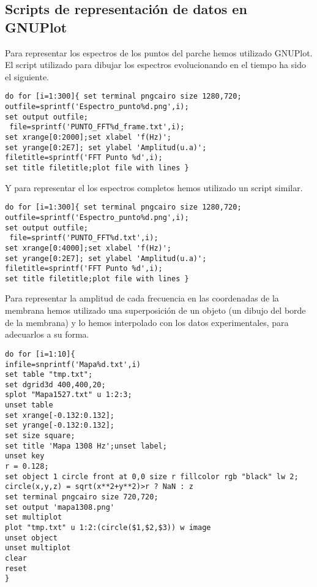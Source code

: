 \documentclass[journal, a4paper,onecolumn]{IEEEtran}
\begin{document}
\subsection{Scripts de representación de datos en GNUPlot}


Para representar los espectros de los puntos del parche hemos utilizado GNUPlot. El script utilizado para dibujar los espectros evolucionando en el tiempo ha sido el siguiente.

\begin{lstlisting}
do for [i=1:300]{ set terminal pngcairo size 1280,720;
outfile=sprintf('Espectro_punto%d.png',i); 
set output outfile;
 file=sprintf('PUNTO_FFT%d_frame.txt',i);
set xrange[0:2000];set xlabel 'f(Hz)'; 
set yrange[0:2E7]; set ylabel 'Amplitud(u.a)';
filetitle=sprintf('FFT Punto %d',i); 
set title filetitle;plot file with lines } 
\end{lstlisting}

Y para representar el los espectros completos hemos utilizado un script similar.

\begin{lstlisting}
do for [i=1:300]{ set terminal pngcairo size 1280,720;
outfile=sprintf('Espectro_punto%d.png',i); 
set output outfile;
 file=sprintf('PUNTO_FFT%d.txt',i);
set xrange[0:4000];set xlabel 'f(Hz)'; 
set yrange[0:2E7]; set ylabel 'Amplitud(u.a)';
filetitle=sprintf('FFT Punto %d',i); 
set title filetitle;plot file with lines } 
\end{lstlisting}

Para representar la amplitud de cada frecuencia en las coordenadas de la membrana hemos utilizado una superposición de un objeto (un dibujo del borde de la membrana) y lo hemos interpolado con los datos experimentales, para adecuarlos a su forma.

\begin{lstlisting}
do for [i=1:10]{ 
infile=snprintf('Mapa%d.txt',i)
set table "tmp.txt";
set dgrid3d 400,400,20;
splot "Mapa1527.txt" u 1:2:3;
unset table
set xrange[-0.132:0.132];
set yrange[-0.132:0.132];
set size square;
set title 'Mapa 1308 Hz';unset label;
unset key
r = 0.128;
set object 1 circle front at 0,0 size r fillcolor rgb "black" lw 2;
circle(x,y,z) = sqrt(x**2+y**2)>r ? NaN : z
set terminal pngcairo size 720,720;
set output 'mapa1308.png'
set multiplot
plot "tmp.txt" u 1:2:(circle($1,$2,$3)) w image
unset object
unset multiplot
clear
reset
}
\end{lstlisting}

\newpage
\end{document}
